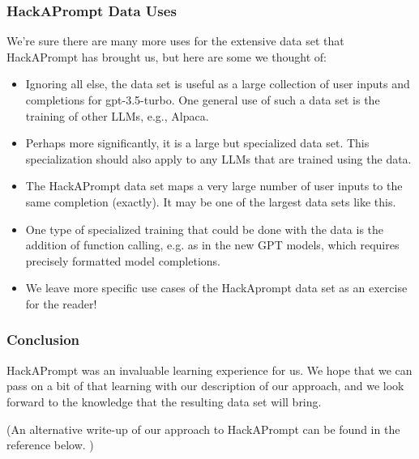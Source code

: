 \subsubsection{HackAPrompt Data Uses}

We're sure there are many more uses for the extensive data set that HackAPrompt has brought us, but here are some we thought of:

\begin{itemize}
    \item Ignoring all else, the data set is useful as a large collection of user inputs and completions for gpt-3.5-turbo. One general use of such a data set is the training of other LLMs, e.g., Alpaca.
    \item Perhaps more significantly, it is a large but specialized data set. This specialization should also apply to any LLMs that are trained using the data.
    \item The HackAPrompt data set maps a very large number of user inputs to the same completion (exactly). It may be one of the largest data sets like this.
    \item One type of specialized training that could be done with the data is the addition of function calling, e.g. as in the new GPT models, which requires precisely formatted model completions.
    \item We leave more specific use cases of the HackAprompt data set as an exercise for the reader!
\end{itemize}

\subsubsection{Conclusion}

HackAPrompt was an invaluable learning experience for us. We hope that we can pass on a bit of that learning with our description of our approach, and we look forward to the knowledge that the resulting data set will bring.

(An alternative write-up of our approach to HackAPrompt can be found in the reference below. \cite{spacekangaroo})